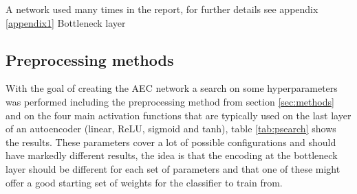 \begin{table}[h!]
{    \caption{A network used many times in the report, for further details see appendix \ref{appendix1} \label{tab:net2}
    \newline *Bottleneck layer}
    }
    \end{table}

    \newpage
    \subsection{Preprocessing methods} \label{sec:psearch}

      With the goal of creating the AEC network a search on some hyperparameters was performed
      including the preprocessing method from section \ref{sec:methods} and on the four main activation functions
      that are typically used on the last layer of an autoencoder (linear, ReLU, sigmoid and tanh), table \ref{tab:psearch} shows the results.
      These parameters cover a lot of possible configurations and should have markedly different results, the idea
      is that the encoding at the bottleneck layer should be different for each set of parameters and that
      one of these might offer a good starting set of weights for the classifier to train from.

